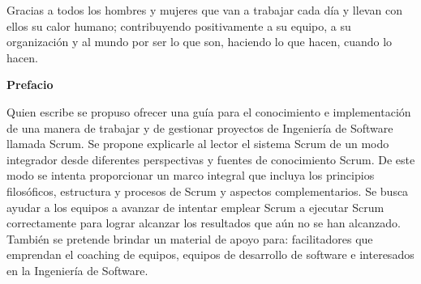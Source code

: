
%

\newpage

\hspace{1cm}\newline %
\vspace{5cm} %

\begin{center}
Gracias a todos los hombres y mujeres que van a trabajar cada día y llevan con ellos su calor humano; contribuyendo positivamente a su equipo, a su organización y al mundo por ser lo que son, haciendo lo que hacen, cuando lo hacen.
\end{center}

\newpage
\vspace{2cm} %
\hspace{1cm}\newline %

%

\newpage

{\large \textbf{Prefacio}}

\vspace{2cm} %

Quien escribe se propuso ofrecer una guía para el conocimiento e implementación de una manera de trabajar y de gestionar proyectos de Ingeniería de Software llamada Scrum. Se propone explicarle al lector el sistema Scrum de un modo integrador desde diferentes perspectivas y fuentes de conocimiento Scrum. De este modo se intenta proporcionar un marco integral que incluya los principios filosóficos, estructura y procesos de Scrum y aspectos complementarios. Se busca ayudar a los equipos a avanzar de intentar emplear Scrum a ejecutar Scrum correctamente para lograr alcanzar los resultados que aún no se han alcanzado. También se pretende brindar un material de apoyo para: facilitadores que emprendan el coaching de equipos, equipos de desarrollo de software e interesados en la Ingeniería de Software.

\newpage
\vspace{2cm} %
\hspace{1cm}\newline %
 
